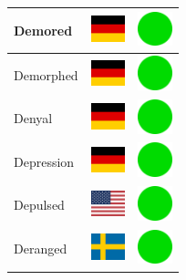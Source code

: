 \documentclass[12pt, a4paper, twoside]{report}
\begin{document}
\begin{center}
\begin{longtable}{|p{5cm}|p{2cm}|p{2cm}|}
 Demored                                                    & \includegraphics[width=1cm]{../4x3/de} &   \includegraphics[width=1cm]{../likes/y} \\ \hline
 Demorphed                                                  & \includegraphics[width=1cm]{../4x3/de} &   \includegraphics[width=1cm]{../likes/y} \\ \hline
 Denyal                                                     & \includegraphics[width=1cm]{../4x3/de} &   \includegraphics[width=1cm]{../likes/y} \\ \hline
 Depression                                                 & \includegraphics[width=1cm]{../4x3/de} &   \includegraphics[width=1cm]{../likes/y} \\ \hline
 Depulsed                                                   & \includegraphics[width=1cm]{../4x3/us} &   \includegraphics[width=1cm]{../likes/y} \\ \hline
 Deranged                                                   & \includegraphics[width=1cm]{../4x3/se} &   \includegraphics[width=1cm]{../likes/y} \\ \hline

\end{longtable}
\end{center}
\end{document}
